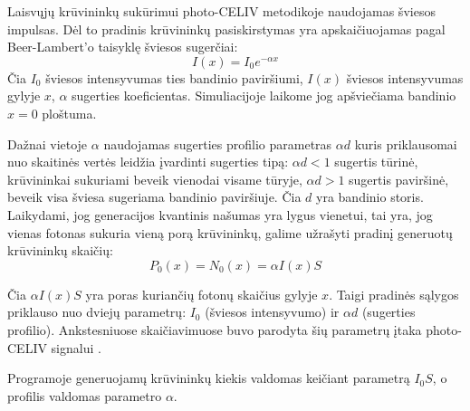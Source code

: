 Laisvųjų krūvininkų sukūrimui photo-CELIV metodikoje naudojamas šviesos impulsas. Dėl to pradinis krūvininkų pasiskirstymas yra apskaičiuojamas pagal Beer-Lambert’o taisyklę šviesos sugerčiai:
\begin{equation}
	I(x)=I_0 e^{-\alpha x}
\end{equation}
Čia \(I_0\) šviesos intensyvumas ties bandinio paviršiumi, \(I(x)\) šviesos intensyvumas gylyje \(x\), \(\alpha\) sugerties koeficientas.
Simuliacijoje laikome jog apšviečiama bandinio \(x=0\) ploštuma.

Dažnai vietoje \(\alpha\) naudojamas sugerties profilio parametras \(\alpha d\) kuris priklausomai nuo skaitinės vertės leidžia įvardinti sugerties tipą: \(\alpha d < 1\) sugertis tūrinė, krūvininkai sukuriami beveik vienodai visame tūryje, \(\alpha d > 1\) sugertis paviršinė, beveik visa šviesa sugeriama bandinio paviršiuje. Čia \(d\) yra bandinio storis.
Laikydami, jog generacijos kvantinis našumas yra lygus vienetui, tai yra, jog vienas fotonas sukuria vieną porą krūvininkų, galime užrašyti pradinį generuotų krūvininkų skaičių:
\begin{equation}
	P_0(x) = N_0(x) = \alpha I(x)S
\end{equation}
	
Čia \(\alpha I(x)S\) yra poras kuriančių fotonų skaičius gylyje \(x\).
Taigi pradinės sąlygos priklauso nuo dviejų parametrų: \(I_0\) (šviesos intensyvumo) ir \(\alpha d\) (sugerties profilio). Ankstesniuose skaičiavimuose buvo parodyta šių parametrų įtaka photo-CELIV signalui \cite{juška:155202}.

Programoje generuojamų krūvininkų kiekis valdomas keičiant parametrą \(I_0 S\), o profilis valdomas parametro \( \alpha \).